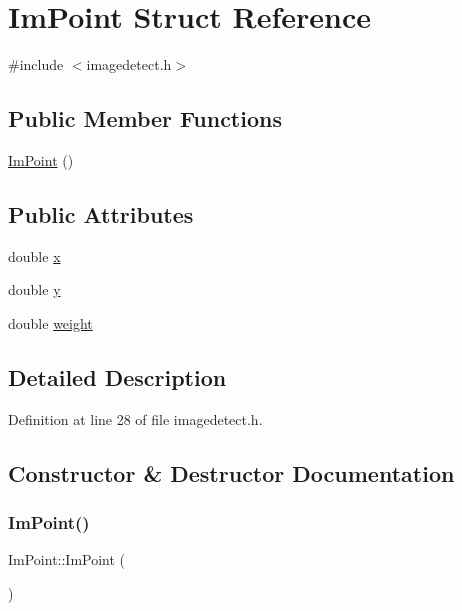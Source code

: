 \hypertarget{struct_im_point}{}\section{Im\+Point Struct Reference}
\label{struct_im_point}


{\ttfamily \#include $<$imagedetect.\+h$>$}

\subsection*{Public Member Functions}
\begin{DoxyCompactItemize}
\item 
\mbox{\hyperlink{struct_im_point_ab7bd329e57ff321713ce13661dcea751}{Im\+Point}} ()
\end{DoxyCompactItemize}
\subsection*{Public Attributes}
\begin{DoxyCompactItemize}
\item 
double \mbox{\hyperlink{struct_im_point_a956198a1aef95b9f295c6f3c5fde5543}{x}}
\item 
double \mbox{\hyperlink{struct_im_point_a506d4a0b1b738354e602ce385b8e5f28}{y}}
\item 
double \mbox{\hyperlink{struct_im_point_a590eeac31f26968234c482e700525c7c}{weight}}
\end{DoxyCompactItemize}


\subsection{Detailed Description}


Definition at line 28 of file imagedetect.\+h.



\subsection{Constructor \& Destructor Documentation}
\mbox{\label{struct_im_point_ab7bd329e57ff321713ce13661dcea751}} 
\subsubsection{\texorpdfstring{ImPoint()}{ImPoint()}}
{\footnotesize\ttfamily Im\+Point\+::\+Im\+Point (\begin{DoxyParamCaption}{ }\end{DoxyParamCaption})\hspace{0.3cm}{\ttfamily [inline]}}



